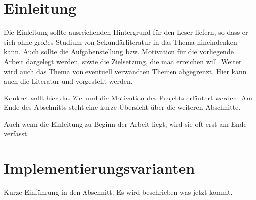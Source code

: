 \documentclass[fleqn,10pt,ngerman]{SelfArx}
\affiliation{\textit{Hochschule Kaiserslautern}} %
\affiliation{\textbf{Corresponding author}: max.mustermann@fh-kl.de} %
\newlength{\tocsep}
\begin{document}
\flushbottom %

\maketitle %

\tableofcontents %

\thispagestyle{empty} %


\section*{Einleitung} %


Die Einleitung sollte ausreichenden Hintergrund für den Leser liefern, so dass er sich ohne großes Studium von Sekundärliteratur
in das Thema hineindenken kann. Auch sollte die Aufgabenstellung bzw. Motivation für die vorliegende Arbeit dargelegt werden, sowie die Zielsetzung, die man erreichen will. Weiter wird auch das Thema von eventuell verwandten Themen abgegrenzt. Hier kann auch die Literatur \cite{Harel:1987,Harel2006} und \cite{Gurp99onthe} vorgestellt werden.

Konkret sollt hier das Ziel und die Motivation des Projekts erläutert werden. Am Ende des Abschnitts steht eine kurze Übersicht über die weiteren Abschnitte.

Auch wenn die Einleitung zu Beginn der Arbeit liegt, wird sie oft erst am Ende verfasst.


\section{Implementierungsvarianten}
Kurze Einführung in den Abschnitt. Es wird beschrieben was jetzt kommt.
\end{document}
